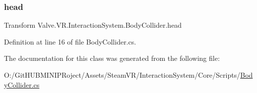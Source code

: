\subsubsection{\texorpdfstring{head}{head}}
{\footnotesize\ttfamily Transform Valve.\+V\+R.\+Interaction\+System.\+Body\+Collider.\+head}



Definition at line 16 of file Body\+Collider.\+cs.



The documentation for this class was generated from the following file\+:\begin{DoxyCompactItemize}
\item 
O\+:/\+Git\+H\+U\+B\+M\+I\+N\+I\+P\+Roject/\+Assets/\+Steam\+V\+R/\+Interaction\+System/\+Core/\+Scripts/\mbox{\hyperlink{_body_collider_8cs}{Body\+Collider.\+cs}}\end{DoxyCompactItemize}
